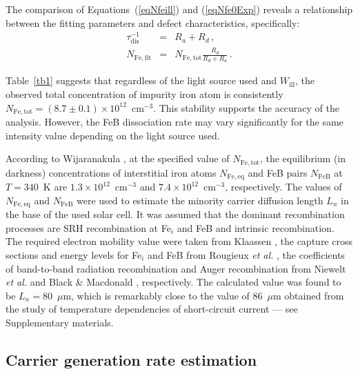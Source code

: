 \documentclass{WileyMSP-template}
\begin{document}
The comparison of Equations~(\ref{eqNfeill}) and (\ref{eqNfe0Exp}) reveals a relationship between 
the fitting parameters and defect characteristics, specifically:
\begin{eqnarray}
\label{eqTauRd}
\tau_\mathrm{dis}^{-1}&=&R_a+R_d\,,\\
\label{eqFefit}
N_\mathrm{Fe,fit}&=&N_\mathrm{Fe,tot}\frac{R_d}{R_d+R_a}\,.
\end{eqnarray}

Table~\ref{tb1} suggests that regardless of the light source used and $W_\mathrm{ill}$, 
the observed total concentration of impurity iron atom is consistently 
$N_\mathrm{Fe,tot}=(8.7\pm0.1)\times10^{12}$~cm$^{-3}$. 
This stability supports the accuracy of the analysis. 
However, the FeB dissociation rate may vary significantly for the same intensity value depending on the light source used.

According to Wijaranakula \cite{FeB:kinetic}, at the specified value of $N_\mathrm{Fe,tot}$, 
the equilibrium (in darkness) concentrations of interstitial iron atoms $N_\mathrm{Fe,eq}$ and FeB pairs 
$N_\mathrm{FeB}$ at $T=340$~K are $1.3\times10^{12}$~cm$^{-3}$ and $7.4\times10^{12}$~cm$^{-3}$, respectively.
The values of $N_\mathrm{Fe,eq}$ and $N_\mathrm{FeB}$ were used to estimate the minority carrier diffusion length $L_n$ 
in the base of the used solar cell. 
It was assumed that the dominant recombination processes are SRH recombination at Fe$_i$ and FeB and intrinsic recombination. 
The required electron mobility value were taken from Klaassen \cite{KLAASSEN953}, 
the capture cross sections and energy levels for Fe$_i$ and FeB from Rougieux \emph{et al.} \cite{ROUGIEUX2018},  
the coefficients of band-to-band radiation recombination and Auger recombination from 
Niewelt \emph{et al.} \cite{Brad2022} and Black \& Macdonald \cite{AugerSi2022}, respectively.
The calculated value was found to be $L_n=80$~$\mu$m, 
which is remarkably close to the value of 86~$\mu$m  obtained from the study of temperature dependencies of short-circuit current --- see Supplementary materials.


\subsection{Carrier generation rate estimation}\label{SecG}
\end{document}
